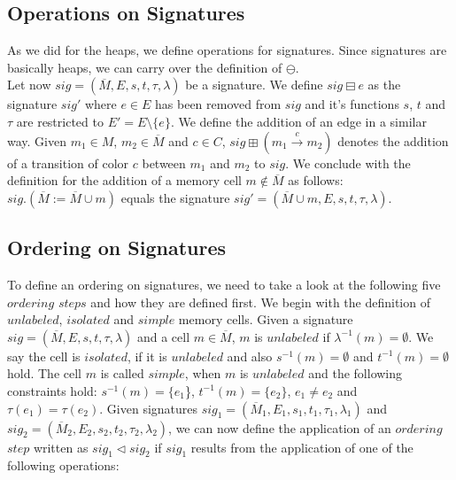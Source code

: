\subsection{Operations on Signatures}
As we did for the heaps, we define operations for signatures. Since signatures are basically heaps, we
can carry over the definition of $\ominus$.\\
Let now $sig = (\overline{M}, E, s, t, \tau, \lambda)$ be a signature. 
We define $sig \boxminus e$ as the signature $sig'$ where $e \in E$ has been removed from $sig$ and it's functions 
$s$, $t$ and $\tau$ are restricted to $E' = E\setminus\{e\}$. We define the addition of an edge in a similar way.
Given $m_1 \in M$, $m_2 \in \overline{M}$ and $c \in C$, $sig \boxplus (m_1 \xrightarrow{c} m_2)$ denotes the addition
of a transition of color $c$ between $m_1$ and $m_2$ to $sig$. We conclude with the definition for the addition of
a memory cell $m \not\in \overline{M}$ as follows: $sig.(\overline{M} := \overline{M} \cup {m})$ equals the signature
$sig' = (\overline{M} \cup {m}, E, s, t, \tau, \lambda)$.

\subsection{Ordering on Signatures}

To define an ordering on signatures, we need to take a look at the following five $ordering$ $steps$ and how they are defined first.
We begin with the definition of $unlabeled$, $isolated$ and $simple$ memory cells.
Given a signature $sig = (\overline{M}, E, s, t, \tau, \lambda)$ and a cell $m \in \overline{M}$, $m$ is $unlabeled$ if 
$\lambda^{-1}(m) = \emptyset$. We say the cell is $isolated$, if it is $unlabeled$ and also $s^{-1}(m) = \emptyset$ and 
$t^{-1}(m) = \emptyset$ hold. The cell $m$ is called $simple$, when $m$ is $unlabeled$ and the following constraints
hold: $s^{-1}(m) = \{e_1$\}, $t^{-1}(m) = \{e_2\}$, $e_1 \not= e_2$ and $\tau(e_1) = \tau(e_2)$. 
Given signatures $sig_1 = (\overline{M}_1, E_1, s_1, t_1, \tau_1, \lambda_1)$ and
$sig_2 = (\overline{M}_2, E_2, s_2, t_2, \tau_2, \lambda_2)$, we can now define the application of an $ordering$ $step$
written as $sig_1 \vartriangleleft sig_2$ if $sig_1$ results
from the application of one of the following operations:

